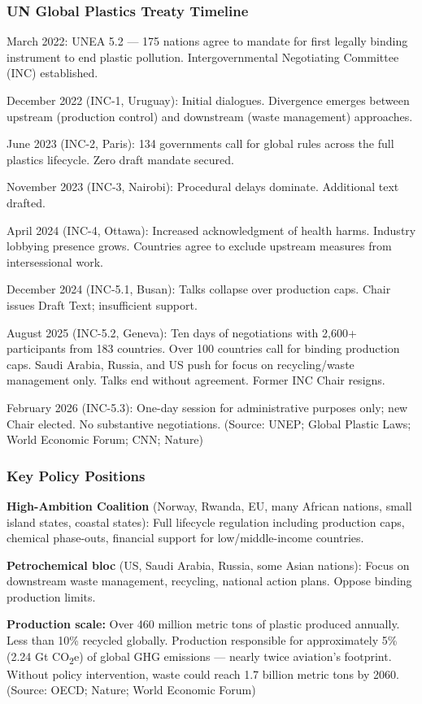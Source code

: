 \documentclass[11pt,letterpaper]{article}
\begin{document}
\subsubsection{UN Global Plastics Treaty Timeline}
March 2022: UNEA 5.2 --- 175 nations agree to mandate for first legally binding instrument to end plastic pollution. Intergovernmental Negotiating Committee (INC) established.

December 2022 (INC-1, Uruguay): Initial dialogues. Divergence emerges between upstream (production control) and downstream (waste management) approaches.

June 2023 (INC-2, Paris): 134 governments call for global rules across the full plastics lifecycle. Zero draft mandate secured.

November 2023 (INC-3, Nairobi): Procedural delays dominate. Additional text drafted.

April 2024 (INC-4, Ottawa): Increased acknowledgment of health harms. Industry lobbying presence grows. Countries agree to exclude upstream measures from intersessional work.

December 2024 (INC-5.1, Busan): Talks collapse over production caps. Chair issues Draft Text; insufficient support.

August 2025 (INC-5.2, Geneva): Ten days of negotiations with 2,600+ participants from 183 countries. Over 100 countries call for binding production caps. Saudi Arabia, Russia, and US push for focus on recycling/waste management only. Talks end without agreement. Former INC Chair resigns.

February 2026 (INC-5.3): One-day session for administrative purposes only; new Chair elected. No substantive negotiations. (Source: UNEP; Global Plastic Laws; World Economic Forum; CNN; Nature)

\subsubsection{Key Policy Positions}
\textbf{High-Ambition Coalition} (Norway, Rwanda, EU, many African nations, small island states, coastal states): Full lifecycle regulation including production caps, chemical phase-outs, financial support for low/middle-income countries.

\textbf{Petrochemical bloc} (US, Saudi Arabia, Russia, some Asian nations): Focus on downstream waste management, recycling, national action plans. Oppose binding production limits.

\textbf{Production scale:} Over 460 million metric tons of plastic produced annually. Less than 10\% recycled globally. Production responsible for approximately 5\% (2.24 Gt CO\textsubscript{2}e) of global GHG emissions --- nearly twice aviation's footprint. Without policy intervention, waste could reach 1.7 billion metric tons by 2060. (Source: OECD; Nature; World Economic Forum)
\end{document}

